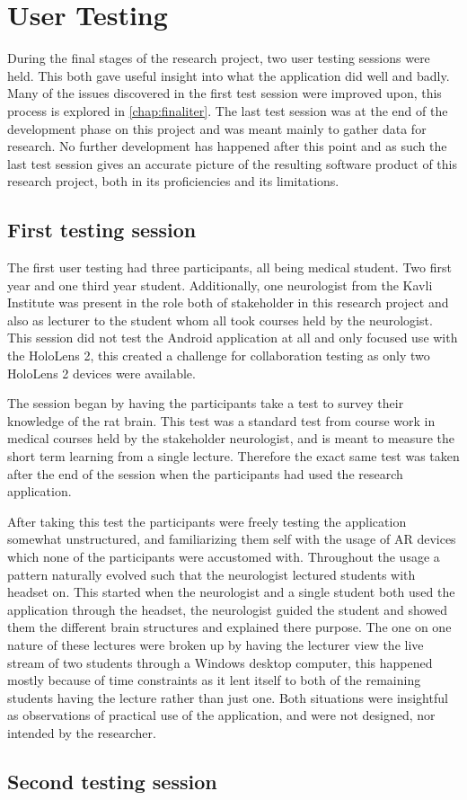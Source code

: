 \section{User Testing}
During the final stages of the research project, two user testing sessions were held. This both gave useful insight into what the application did well and badly. Many of the issues discovered in the first test session were improved upon, this process is explored in \autoref{chap:finaliter}. The last test session was at the end of the development phase on this project and was meant mainly to gather data for research. No further development has happened after this point and as such the last test session gives an accurate picture of the resulting software product of this research project, both in its proficiencies and its limitations. 

\subsection*{First testing session}

The first user testing had three participants, all being medical student. Two first year and one third year student. Additionally, one neurologist from the Kavli Institute was present in the role both of stakeholder in this research project and also as lecturer to the student whom all took courses held by the neurologist. This session did not test the Android application at all and only focused use with the HoloLens 2, this created a challenge for collaboration testing as only two HoloLens 2 devices were available. 

The session began by having the participants take a test to survey their knowledge of the rat brain. This test was a standard test from course work in medical courses held by the stakeholder neurologist, and is meant to measure the short term learning from a single lecture. Therefore the exact same test was taken after the end of the session when the participants had used the research application.

After taking this test the participants were freely testing the application somewhat unstructured, and familiarizing them self with the usage of AR devices which none of the participants were accustomed with. Throughout the usage a pattern naturally evolved such that the neurologist lectured students with headset on. This started when the neurologist and a single student both used the application through the headset, the neurologist guided the student and showed them the different brain structures and explained there purpose. The one on one nature of these lectures were broken up by having the lecturer view the live stream of two students through a Windows desktop computer, this happened mostly because of time constraints as it lent itself to both of the remaining students having the lecture rather than just one. 
Both situations were insightful as observations of practical use of the application, and were not designed, nor intended by the researcher. 



\subsection*{Second testing session}




